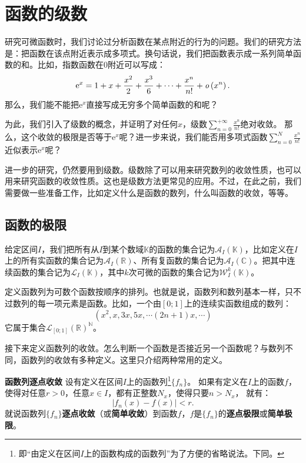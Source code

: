 \documentclass[12pt,UTF8]{ctexbook}
\begin{document}
\chapter{函数的级数}

研究可微函数时，我们讨论过分析函数在某点附近的行为的问题。我们的研究方法是：把函数在该点附近表示成多项式。换句话说，我们把函数表示成一系列简单函数的和。比如，指数函数在$0$附近可以写成：
$$\mathrm{e}^x = 1 + x + \frac{x^2}{2} + \frac{x^3}{6} + \cdots + \frac{x^n}{n!} + \mathit{o}\left(x^n\right).$$
那么，我们能不能把$\mathrm{e}^x$直接写成无穷多个简单函数的和呢？

为此，我们引入了级数的概念，并证明了对任何$x$，级数$\sum_{n=0}^{+\infty}\frac{x^{n}}{n!}$绝对收敛。
那么，这个收敛的极限是否等于$\mathrm{e}^x$呢？进一步来说，我们能否用多项式函数$\sum_{n=0}^N\frac{x^{n}}{n!}$
近似表示$\mathrm{e}^x$呢？

进一步的研究，仍然要用到级数。级数除了可以用来研究数列的收敛性质，也可以用来研究函数的收敛性质。这也是级数方法更常见的应用。不过，在此之前，我们需要做一些准备工作，比如定义什么是函数的数列，什么叫函数的收敛，等等。

\section{函数的极限}

给定区间$I$，我们把所有从$I$到某个数域$\mathbb{K}$的函数的集合记为$\mathcal{A}_I(\mathbb{K})$，比如定义在$I$上的所有实函数的集合记为$\mathcal{A}_I(\mathbb{R})$、所有复函数的集合记为$\mathcal{A}_I(\mathbb{C})$。把其中连续函数的集合记为$\mathcal{L}_I(\mathbb{K})$，其中$k$次可微的函数的集合记为$\mathcal{W}_I^k(\mathbb{K})$。

定义函数列为可数个函数按顺序的排列。也就是说，函数列和数列基本一样，只不过数列的每一项元素是函数。比如，一个由$[0;1]$上的连续实函数组成的数列：
$$ (x^2, x, 3x, 5x, \cdots (2n+1)x, \cdots )$$
它属于集合$\mathcal{L}_{[0;1]}(\mathbb{R})^{\mathbb{N}}$。

接下来定义函数列的收敛。怎么判断一个函数是否接近另一个函数呢？与数列不同，函数列的收敛有多种定义。这里只介绍两种常用的定义。
\begin{df}{\textbf{函数列逐点收敛}}
    设有定义在区间$I$上的函数列\footnote{即“由定义在区间$I$上的函数构成的函数列”为了方便的省略说法。下同。}$\{f_n\}$。
    如果有定义在$I$上的函数$f$，使得对任意$r>0$，任意$x\in I$，都有正整数$N_x$，使得只要$n>N_x$，
    就有：
    $$ |f_n(x) - f(x) | < r.$$
    就说函数列$\{f_n\}$\textbf{逐点收敛}（或\textbf{简单收敛}）到函数$f$，$f$是$\{f_n\}$的\textbf{逐点极限}或\textbf{简单极限}。
\end{df}
\end{document}
